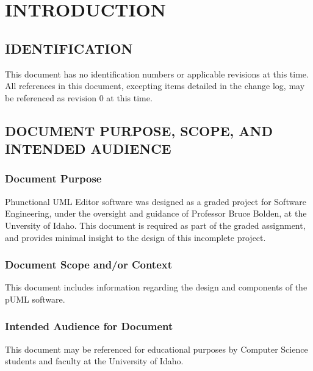 \documentclass[twoside,letterpaper]{article}
\begin{document}
\bigskip

\bigskip
\clearpage\setcounter{page}{1}\pagestyle{Convertiv}
\section[INTRODUCTION]{\bfseries\color{black}
INTRODUCTION}

\subsection{IDENTIFICATION}

{\color{black}
This document has no identification numbers or applicable
revisions at this time.  All references in this document,
excepting items detailed in the change log, may be referenced
as revision 0 at this time.

\subsection[DOCUMENT PURPOSE, SCOPE, AND INTENDED
AUDIENCE]{\bfseries\color{black} DOCUMENT
PURPOSE, SCOPE, AND INTENDED AUDIENCE}

\subsubsection{Document Purpose}
{\color{black}
Phunctional UML Editor software was designed as a graded project for
Software Engineering, under the oversight and guidance of Professor
Bruce Bolden, at the Unversity of Idaho.  This document is required
as part of the graded assignment, and provides minimal insight to the
design of this incomplete project.  
}

\subsubsection{Document Scope and/or Context}
{\color{black}
This document includes information regarding the design and components of the pUML software.
}

\subsubsection{Intended Audience for Document}
{\color{black}
This document may be referenced for educational purposes by
Computer Science students and faculty at the University of Idaho.

}}
\end{document}
